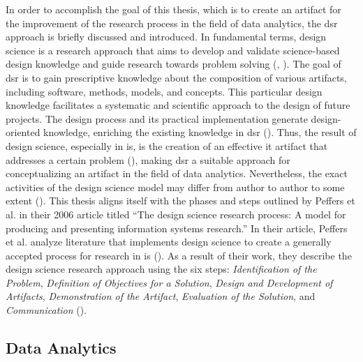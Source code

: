 In order to accomplish the goal of this thesis, which is to create an artifact for the improvement of the research process in the field of data analytics, the \ac{dsr} approach is briefly discussed and introduced. In fundamental terms, design science is a research approach that aims to develop and validate science-based design knowledge and guide research towards problem solving (\cite{Hevner.2004}, \cite{Dresch.2015}). The goal of \ac{dsr} is to gain prescriptive knowledge about the composition of various artifacts, including software, methods, models, and concepts. This particular design knowledge facilitates a systematic and scientific approach to the design of future projects. The design process and its practical implementation generate design-oriented knowledge, enriching the existing knowledge in \ac{dsr} (\cite{Hevner.2004}). Thus, the result of design science, especially in \ac{is}, is the creation of an effective \ac{it} artifact that addresses a certain problem (\cite{Hevner.2004}), making \ac{dsr} a suitable approach for conceptualizing an artifact in the field of data analytics. Nevertheless, the exact activities of the design science model may differ from author to author to some extent (\cite{Fulcher.1996}). This thesis aligns itself with the phases and steps outlined by Peffers et al. in their 2006 article titled \enquote{The design science research process: A model for producing and presenting information systems research.} In their article, Peffers et al. analyze literature that implements design science to create a generally accepted process for research in \ac{is} (\cite{Peffers.2006}). As a result of their work, they describe the design science research approach using the six steps: \textit{Identification of the Problem}, \textit{Definition of Objectives for a Solution}, \textit{Design and Development of Artifacts}, \textit{Demonstration of the Artifact}, \textit{Evaluation of the Solution}, and \textit{Communication} (\cite{Peffers.2006}).



\subsection{Data Analytics}

